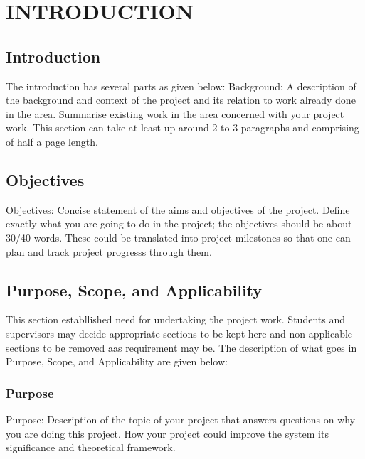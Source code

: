 
\chapter{INTRODUCTION} %

\label{Chapter1} %



\section{Introduction}
The introduction has several parts as given below:
Background: A description of the background and context of the project and its relation to work already done in the area. Summarise existing work in the area concerned with your project work. This section can take at least up around 2 to 3 paragraphs and comprising of half a page length.

\section{Objectives}
Objectives: Concise statement of the aims and objectives of the project. Define exactly what you are going to do in the project; the objectives should be about 30/40 words. These could be translated into project milestones so that one can plan and track project progresss through them.

\section{Purpose, Scope, and Applicability}
This section establlished need for undertaking the project work. Students and supervisors may decide appropriate sections to be kept here and non applicable sections to be removed aas requirement may be. The description of what goes in Purpose, Scope, and Applicability are given below:

\subsection{Purpose}
Purpose: Description of the topic of your project that answers questions on why you are doing this project. How your project could improve the system its significance and theoretical framework.

